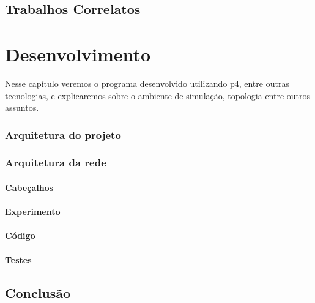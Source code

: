 \documentclass[12pt,
openright, 
oneside,
a4paper,
brazil]{facom-ufu-abntex2}
\begin{document}
\section{Trabalhos Correlatos}


\chapter{Desenvolvimento}
Nesse capítulo veremos o programa desenvolvido utilizando p4, entre outras tecnologias, e explicaremos sobre o ambiente de simulação, topologia entre outros assuntos.
 
\subsection{Arquitetura do projeto}
\subsection{Arquitetura da rede}
\subsubsection{Cabeçalhos}
\subsubsection{Experimento}
\subsubsection{Código}
\subsubsection{Testes}

\section{Conclusão}





\end{document}
